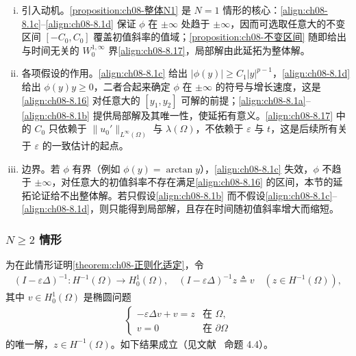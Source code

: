 \documentclass[../../main.tex]{subfiles}%
\begin{document}
\begin{remark}\label{remark:ch08-整体N1动机}
\begin{enumerate}[(i)]
\item 引入动机。\cref{proposition:ch08-整体N1} 是 $N=1$ 情形的核心：\eqref{align:ch08-8.1c}--\eqref{align:ch08-8.1d} 保证 $\phi$ 在 $\pm\infty$ 处趋于 $\pm\infty$，因而可选取任意大的不变区间 $[-C_0,C_0]$ 覆盖初值斜率的值域；\cref{proposition:ch08-不变区间} 随即给出与时间无关的 $W^{1,\infty}_0$ 界\eqref{align:ch08-8.17}，局部解由此延拓为整体解。
\item 各项假设的作用。\eqref{align:ch08-8.1c} 给出 $|\phi(y)|\geqslant C_1|y|^{p-1}$，\eqref{align:ch08-8.1d} 给出 $\phi(y)y\geqslant0$，二者合起来确定 $\phi$ 在 $\pm\infty$ 的符号与增长速度，这是\eqref{align:ch08-8.16} 对任意大的 $[y_1,y_2]$ 可解的前提；\eqref{align:ch08-8.1a}--\eqref{align:ch08-8.1b} 提供局部解及其唯一性，使延拓有意义。\eqref{align:ch08-8.17} 中的 $C_0$ 只依赖于 $\|u_0'\|_{L^\infty(\Omega)}$ 与 $\lambda(\Omega)$，不依赖于 $\varepsilon$ 与 $t$，这是后续所有关于 $\varepsilon$ 的一致估计的起点。
\item 边界。若 $\phi$ 有界（例如 $\phi(y)=\arctan y$），\eqref{align:ch08-8.1c} 失效，$\phi$ 不趋于 $\pm\infty$，对任意大的初值斜率不存在满足\eqref{align:ch08-8.16} 的区间，本节的延拓论证给不出整体解。若只假设\eqref{align:ch08-8.1b} 而不假设\eqref{align:ch08-8.1c}--\eqref{align:ch08-8.1d}，则只能得到局部解，且存在时间随初值斜率增大而缩短。
\end{enumerate}
\end{remark}

\subsubsection{$N\geqslant2$ 情形}\label{subsubsection:ch08-N2存在}

为在此情形证明\cref{theorem:ch08-正则化适定}，令
\begin{align*}
(I-\varepsilon\Delta)^{-1}:H^{-1}(\Omega)\to H^1_0(\Omega),\quad
(I-\varepsilon\Delta)^{-1}z\triangleq v\quad(z\in H^{-1}(\Omega)),
\end{align*}
其中 $v\in H^1_0(\Omega)$ 是椭圆问题
\begin{align}\label{align:ch08-8.18}
\begin{cases}
-\varepsilon\Delta v+v=z & \text{在 }\Omega,\\
v=0 & \text{在 }\partial\Omega
\end{cases}
\end{align}
的唯一解，$z\in H^{-1}(\Omega)$。如下结果成立（见文献~\cite{ref30} 命题 4.4）。
\end{document}
